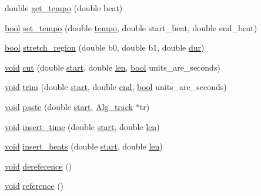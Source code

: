 \begin{DoxyCompactItemize}
double \hyperlink{class_alg__time__map_af5f8d3df762d768e1572426b9c6ec8fe}{get\+\_\+tempo} (double beat)
\item 
\hyperlink{mac_2config_2i386_2lib-src_2libsoxr_2soxr-config_8h_abb452686968e48b67397da5f97445f5b}{bool} \hyperlink{class_alg__time__map_a71d4110ed79faf312dc0cf4f38a25c76}{set\+\_\+tempo} (double \hyperlink{midiclock_8c_a15448d4a27a20e04e8ba36b18593f069}{tempo}, double start\+\_\+beat, double end\+\_\+beat)
\item 
\hyperlink{mac_2config_2i386_2lib-src_2libsoxr_2soxr-config_8h_abb452686968e48b67397da5f97445f5b}{bool} \hyperlink{class_alg__time__map_a0c323fb432969df2c96c6797f403266e}{stretch\+\_\+region} (double b0, double b1, double \hyperlink{seqread_8c_a3c79b5a9ee81c3835b8de9b0d900d2de}{dur})
\item 
\hyperlink{sound_8c_ae35f5844602719cf66324f4de2a658b3}{void} \hyperlink{class_alg__time__map_ae02ef28cbedb472532442b7c77d9b456}{cut} (double \hyperlink{seqread_8c_ac503262ae470564980711da4f78b1181}{start}, double \hyperlink{lib_2expat_8h_af86d325fecfc8f47b61fbf5a5146f582}{len}, \hyperlink{mac_2config_2i386_2lib-src_2libsoxr_2soxr-config_8h_abb452686968e48b67397da5f97445f5b}{bool} units\+\_\+are\+\_\+seconds)
\item 
\hyperlink{sound_8c_ae35f5844602719cf66324f4de2a658b3}{void} \hyperlink{class_alg__time__map_a28119fddcc5703188aba69b34361a04b}{trim} (double \hyperlink{seqread_8c_ac503262ae470564980711da4f78b1181}{start}, double \hyperlink{convtest_8m_afb358f48b1646c750fb9da6c6585be2b}{end}, \hyperlink{mac_2config_2i386_2lib-src_2libsoxr_2soxr-config_8h_abb452686968e48b67397da5f97445f5b}{bool} units\+\_\+are\+\_\+seconds)
\item 
\hyperlink{sound_8c_ae35f5844602719cf66324f4de2a658b3}{void} \hyperlink{class_alg__time__map_aece9ce87986fedb6741b1b170b0d8716}{paste} (double \hyperlink{seqread_8c_ac503262ae470564980711da4f78b1181}{start}, \hyperlink{class_alg__track}{Alg\+\_\+track} $\ast$tr)
\item 
\hyperlink{sound_8c_ae35f5844602719cf66324f4de2a658b3}{void} \hyperlink{class_alg__time__map_a5f04de0cd2d8aeda6b5b01aabd1b2a55}{insert\+\_\+time} (double \hyperlink{seqread_8c_ac503262ae470564980711da4f78b1181}{start}, double \hyperlink{lib_2expat_8h_af86d325fecfc8f47b61fbf5a5146f582}{len})
\item 
\hyperlink{sound_8c_ae35f5844602719cf66324f4de2a658b3}{void} \hyperlink{class_alg__time__map_a70e62a148767b6bf8416575d68a66cf5}{insert\+\_\+beats} (double \hyperlink{seqread_8c_ac503262ae470564980711da4f78b1181}{start}, double \hyperlink{lib_2expat_8h_af86d325fecfc8f47b61fbf5a5146f582}{len})
\item 
\hyperlink{sound_8c_ae35f5844602719cf66324f4de2a658b3}{void} \hyperlink{class_alg__time__map_af6ec481b037bf604d513d5c2f87856ee}{dereference} ()
\item 
\hyperlink{sound_8c_ae35f5844602719cf66324f4de2a658b3}{void} \hyperlink{class_alg__time__map_a8a1acc25deae7d3da2d57f52824064c7}{reference} ()
\end{DoxyCompactItemize}
